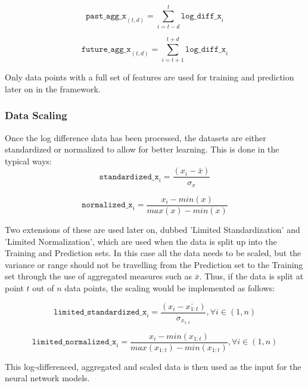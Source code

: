 \documentclass[a4paper,11pt,oneside]{article}
\theoremstyle{plain}
\theoremstyle{definition}
\begin{document}
\begin{equation}
\texttt{past\_agg\_x}_{(t,d)} = \sum_{i = t-d}^{t} \texttt{log\_diff\_x}_i
\end{equation}

\begin{equation}
\texttt{future\_agg\_x}_{(t,d)} = \sum_{i = t+1}^{t+d} \texttt{log\_diff\_x}_i
\end{equation}

Only data points with a full set of features are used for training and prediction later on in the framework.

\subsubsection{Data Scaling}\label{data_scaling}
Once the log difference data has been processed, the datasets are either standardized or normalized to allow for better learning. This is done in the typical ways:
\begin{equation}
\texttt{standardized\_x}_i = \frac{(x_i - \bar{x}) }{\sigma_x}
\end{equation}

\begin{equation}\label{eq_ltd_normalization}
\texttt{normalized\_x}_i = \frac{x_i - min(x) }{max(x) - min(x)}
\end{equation}

Two extensions of these are used later on, dubbed 'Limited Standardization' and 'Limited Normalization', which are used when the data is split up into the Training and Prediction sets. In this case all the data needs to be scaled, but the variance or range should not be travelling from the Prediction set to the Training set through the use of aggregated measures such as $\bar{x}$. Thus, if the data is split at point $t$ out of $n$ data points, the scaling would be implemented as follows:

\begin{equation}
\texttt{limited\_standardized\_x}_i = \frac{(x_i - \bar{x_{1:t}}) }{\sigma_{x_{1:t}}} , \forall  i \in (1, n)
\end{equation}

\begin{equation}
\texttt{limited\_normalized\_x}_i = \frac{x_i - min(x_{1:t}) }{max(x_{1:t}) - min(x_{1:t})} , \forall  i \in (1, n)
\end{equation}


This log-differenced, aggregated and scaled data is then used as the input for the neural network models.
\end{document}
